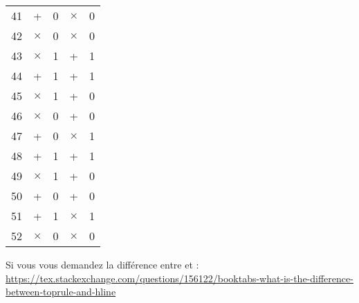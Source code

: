 \begin{longtable}{c|cc|cc}
  41     & +                          & 0                       & $\times$ & 0   \\
  42     & $\times$                   & 0                       & $\times$ & 0   \\
  43     & $\times$                   & 1                       & +        & 1   \\
  44     & +                          & 1                       & +        & 1   \\
  45     & $\times$                   & 1                       & +        & 0   \\
  46     & $\times$                   & 0                       & +        & 0   \\
  47     & +                          & 0                       & $\times$ & 1   \\
  48     & +                          & 1                       & +        & 1   \\
  49     & $\times$                   & 1                       & +        & 0   \\
  50     & +                          & 0                       & +        & 0   \\
  51     & +                          & 1                       & $\times$ & 1   \\
  52     & $\times$                   & 0                       & $\times$ & 0   \\ \hline
  \bottomrule
\end{longtable}


Si vous vous demandez la différence entre  et  : \url{https://tex.stackexchange.com/questions/156122/booktabs-what-is-the-difference-between-toprule-and-hline}